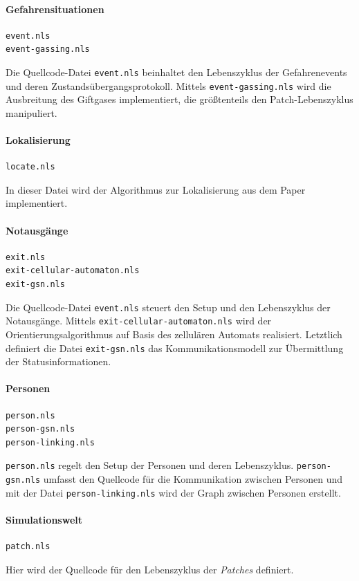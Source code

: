 \paragraph{Gefahrensituationen} 

\begin{verbatim}
event.nls
event-gassing.nls
\end{verbatim}

Die Quellcode-Datei \verb|event.nls| beinhaltet den Lebenszyklus der Gefahrenevents und deren Zustandsübergangsprotokoll. Mittels \verb|event-gassing.nls| wird die Ausbreitung des Giftgases implementiert, die größtenteils den Patch-Lebenszyklus manipuliert.

\paragraph{Lokalisierung}

\begin{verbatim}
locate.nls
\end{verbatim}

In dieser Datei wird der Algorithmus zur Lokalisierung aus dem Paper \cite{Jonathan.2004} implementiert.

\paragraph{Notausgänge}

\begin{verbatim}
exit.nls
exit-cellular-automaton.nls
exit-gsn.nls
\end{verbatim}

Die Quellcode-Datei \verb|event.nls| steuert den Setup und den Lebenszyklus der Notausgänge. Mittels \verb|exit-cellular-automaton.nls| wird der Orientierungsalgorithmus auf Basis des zellulären Automats realisiert. Letztlich definiert die Datei \verb|exit-gsn.nls| das Kommunikationsmodell zur Übermittlung der Statusinformationen.

\paragraph{Personen}

\begin{verbatim}
person.nls
person-gsn.nls
person-linking.nls
\end{verbatim}

\verb|person.nls| regelt den Setup der Personen und deren Lebenszyklus. \verb|person-gsn.nls| umfasst den Quellcode für die Kommunikation zwischen Personen und mit der Datei \verb|person-linking.nls| wird der Graph zwischen Personen erstellt.

\paragraph{Simulationswelt}

\begin{verbatim}
patch.nls
\end{verbatim}

Hier wird der Quellcode für den Lebenszyklus der \emph{Patches} definiert.